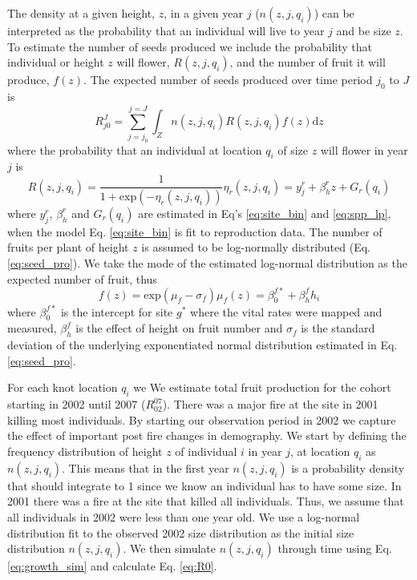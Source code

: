 \documentclass[12pt,a4paper]{article}
\begin{document}
The density at a given height, $z$, in a given year $j$ ($n(z, j, q_i)$) can be interpreted as the probability that an individual will live to year $j$ and be size $z$. To estimate the number of seeds produced we include the probability that individual or height $z$ will flower, $R(z, j, q_i)$, and the number of fruit it will produce, $f(z)$. The expected number of seeds produced over time period $j_0$ to $J$ is
\begin{equation}\label{eq:R0}
	R_{j0}^J = \sum_{j = j_0}^{j = J} \int_Z n(z, j, q_i)R(z, j, q_i)f(z)\text{d}z
\end{equation}
where the probability that an individual at location $q_i$ of size $z$ will flower in year $j$ is 
\begin{subequations}
\label{eq:prob_flower}
\begin{equation}
	R(z, j, q_i) = \frac{1}{1 + \text{exp}(-\eta_r(z, j, q_i))}
\end{equation}
\begin{equation}
	\eta_r(z, j, q_i) = y_j^r + \beta_h^r z + G_r(q_i)
\end{equation}
\end{subequations}
where $y_j^r$, $\beta_h^r$ and $G_r(q_i)$ are estimated in Eq's \ref{eq:site_bin} and \ref{eq:spp_lp}, when the model Eq. \ref{eq:site_bin} is fit to reproduction data. The number of fruits per plant of height $z$ is assumed to be log-normally distributed (Eq. \ref{eq:seed_pro}). We take the mode of the estimated log-normal distribution as the expected number of fruit, thus
\begin{subequations}
\begin{equation}
	f(z) = \text{exp}(\mu_f - \sigma_f)
\end{equation}
\begin{equation}
	\mu_f(z) = \beta_0^{f*} + \beta_h^f h_i
\end{equation}      
\end{subequations}
where $\beta_0^{f*}$ is the intercept for site $g^*$ where the vital rates were mapped and measured, $\beta_h^f$ is the effect of height on fruit number and $\sigma_f$ is the standard deviation of the underlying exponentiated normal distribution estimated in Eq. \ref{eq:seed_pro}. 
 
For each knot location $q_i$ we We estimate total fruit production for the cohort starting in 2002 until 2007 ($R_{02}^{07}$). There was a major fire at the site in 2001 killing most individuals. By starting our observation period in 2002 we capture the effect of important post fire changes in demography. We start by defining the frequency distribution of height $z$ of individual $i$ in year $j$, at location $q_i$ as $n(z, j, q_i)$. This means that in the first year $n(z, j, q_i)$ is a probability density that should integrate to 1 since we know an individual has to have some size. In 2001 there was a fire at the site that killed all individuals. Thus, we assume that all individuals in 2002 were less than one year old. We use a log-normal distribution fit to the observed 2002 size distribution as the initial size distribution $n(z, j, q_i)$. We then simulate $n(z, j, q_i)$ through time using Eq. \ref{eq:growth_sim} and calculate Eq. \ref{eq:R0}.    
\end{document}
